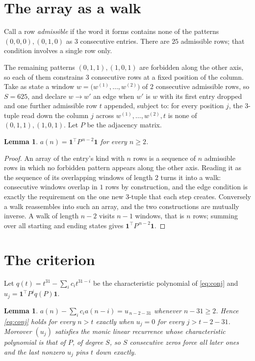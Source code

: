 \documentclass[11pt,a4paper]{article}
\theoremstyle{plain}
\newtheorem{lemma}[theorem]{Lemma}
\theoremstyle{definition}
\begin{document}
\section{The array as a walk}

Call a row \emph{admissible} if the word it forms contains none of the patterns
$(0,0,0), (0,1,0)$ as $3$ consecutive entries. There are $25$ admissible rows; that condition
involves a single row only.

The remaining patterns $(0,1,1), (1,0,1)$ are forbidden along the other axis, so each of them
constrains $3$ consecutive rows at a fixed position of the column. Take as state a
window $w=\bigl(w^{(1)},\dots,w^{(2)}\bigr)$ of $2$ consecutive admissible
rows, so $S=625$, and declare $w\to w'$ an edge when $w'$ is $w$ with its first entry
dropped and one further admissible row $t$ appended, subject to: for every position
$j$, the $3$-tuple read down the column $j$ across $w^{(1)},\dots,w^{(2)},t$
is none of $(0,1,1), (1,0,1)$. Let $P$ be the adjacency matrix.

\begin{lemma}\label{lem:walk}
$a(n)=\mathbf{1}^{\!\top}P^{\,n-2}\mathbf{1}$ for every $n\ge2$.
\end{lemma}

\begin{proof}
An array of the entry's kind with $n$ rows is a sequence of $n$ admissible rows in
which no forbidden pattern appears along the other axis. Reading it as the sequence of its
overlapping windows of length $2$ turns it into a walk: consecutive windows overlap in
$1$ rows by construction, and the edge condition is exactly the requirement on the one
new $3$-tuple that each step creates. Conversely a walk reassembles into such an array,
and the two constructions are mutually inverse. A walk of length $n-2$ visits $n-1$
windows, that is $n$ rows; summing over all starting and ending states gives
$\mathbf{1}^{\!\top}P^{\,n-2}\mathbf{1}$.
\end{proof}

\section{The criterion}

Let $q(t)=t^{31}-\sum_i c_i t^{31-i}$ be the characteristic polynomial of
\eqref{eq:conj} and $u_j=\mathbf{1}^{\!\top}P^{j}q(P)\mathbf{1}$.

\begin{lemma}\label{lem:crit}
$a(n)-\sum_i c_i a(n-i)=u_{\,n-2-31}$ whenever $n-31\ge2$. Hence
\eqref{eq:conj} holds for every $n>t$ exactly when $u_j=0$ for every
$j>t-2-31$. Moreover $(u_j)$ satisfies the monic linear recurrence whose
characteristic polynomial is that of $P$, of degree $S$, so $S$ consecutive zeros force all
later ones and the last nonzero $u_j$ pins $t$ down exactly.
\end{lemma}
\end{document}
